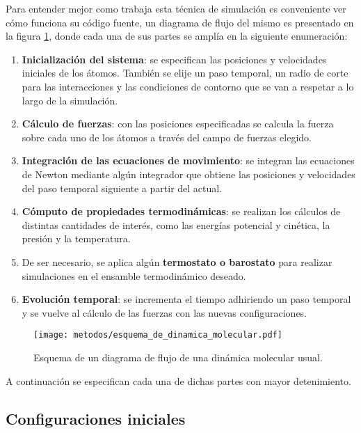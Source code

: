 Para entender mejor como trabaja esta técnica de simulación es conveniente ver
cómo funciona su código fuente, un diagrama de flujo del mismo es presentado en 
la figura \ref{fig:esquema_md}, donde cada una de sus partes se amplía en la 
siguiente enumeración:
\begin{enumerate}
    \item \textbf{Inicialización del sistema}: se especifican las posiciones y
        velocidades iniciales de los átomos. También se elije un paso temporal, 
        un radio de corte para las interacciones y las condiciones de contorno que
        se van a respetar a lo largo de la simulación. 
    \item \textbf{Cálculo de fuerzas}: con las posiciones especificadas se
        calcula la fuerza sobre cada uno de los átomos a través del campo de 
        fuerzas elegido.
    \item \textbf{Integración de las ecuaciones de movimiento}: se integran las
        ecuaciones de Newton mediante algún integrador que obtiene las posiciones
        y velocidades del paso temporal siguiente a partir del actual.
    \item \textbf{Cómputo de propiedades termodinámicas}: se realizan los
        cálculos de distintas cantidades de interés, como las energías potencial
        y cinética, la presión y la temperatura.
    \item De ser necesario, se aplica algún \textbf{termostato o barostato}
        para realizar simulaciones en el ensamble termodinámico deseado.
    \item \textbf{Evolución temporal}: se incrementa el tiempo adhiriendo un
        paso temporal y se vuelve al cálculo de las fuerzas con las nuevas 
        configuraciones.
\end{enumerate}

\begin{figure}
    \centering
    \texttt{[image: metodos/esquema\_de\_dinamica\_molecular.pdf]}
    \caption{Esquema de un diagrama de flujo de una dinámica molecular usual.}
    \label{fig:esquema_md}
\end{figure}

A continuación se especifican cada una de dichas partes con mayor detenimiento.

\subsection{Configuraciones iniciales}

